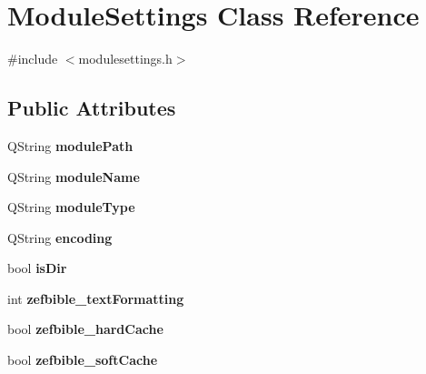 \hypertarget{classModuleSettings}{
\section{ModuleSettings Class Reference}
\label{classModuleSettings}
}


{\ttfamily \#include $<$modulesettings.h$>$}\subsection*{Public Attributes}
\begin{DoxyCompactItemize}
\item 
\hypertarget{classModuleSettings_aa408aa93b659f03f91d66e742c56c39c}{
QString {\bfseries modulePath}}
\label{classModuleSettings_aa408aa93b659f03f91d66e742c56c39c}

\item 
\hypertarget{classModuleSettings_acf1a856fdf42a2ceee420d478a272256}{
QString {\bfseries moduleName}}
\label{classModuleSettings_acf1a856fdf42a2ceee420d478a272256}

\item 
\hypertarget{classModuleSettings_aa5aa01e89cd61f4b19134b0d5d372034}{
QString {\bfseries moduleType}}
\label{classModuleSettings_aa5aa01e89cd61f4b19134b0d5d372034}

\item 
\hypertarget{classModuleSettings_a0c0bb115443c382e54e406aa1a0ecce2}{
QString {\bfseries encoding}}
\label{classModuleSettings_a0c0bb115443c382e54e406aa1a0ecce2}

\item 
\hypertarget{classModuleSettings_a8609fa8d6e05485f136ede4b7497d393}{
bool {\bfseries isDir}}
\label{classModuleSettings_a8609fa8d6e05485f136ede4b7497d393}

\item 
\hypertarget{classModuleSettings_ae48c0b3d62cf6e20b6ecf6d2c9df46bb}{
int {\bfseries zefbible\_\-textFormatting}}
\label{classModuleSettings_ae48c0b3d62cf6e20b6ecf6d2c9df46bb}

\item 
\hypertarget{classModuleSettings_a3a2e80afc1f966db21ef5fb326dbdf7f}{
bool {\bfseries zefbible\_\-hardCache}}
\label{classModuleSettings_a3a2e80afc1f966db21ef5fb326dbdf7f}

\item 
\hypertarget{classModuleSettings_a457dcb021bbe45a905fd66e0e92c9435}{
bool {\bfseries zefbible\_\-softCache}}
\label{classModuleSettings_a457dcb021bbe45a905fd66e0e92c9435}


\end{DoxyCompactItemize}
